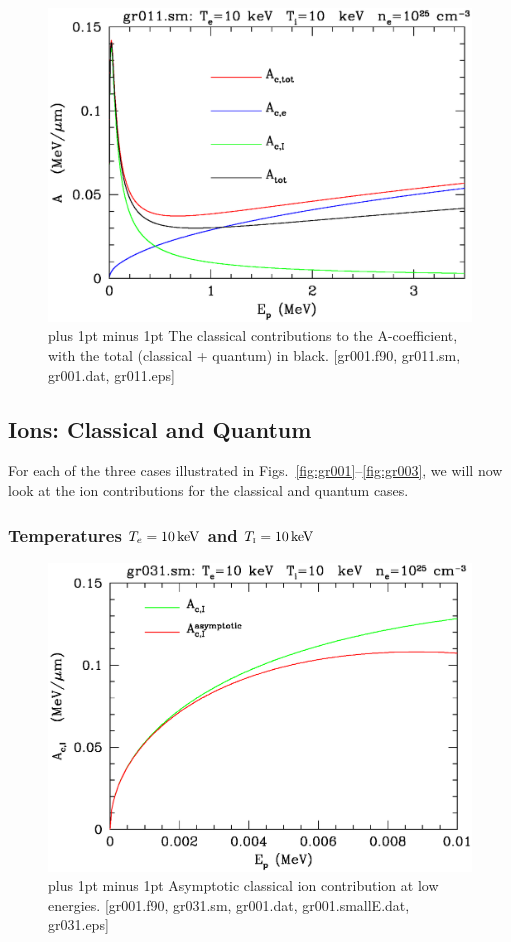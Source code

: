 \documentclass[preprint,12pt,eqsecnum,nofootinbib,amsmath,amssymb]{revtex4}
\newcommand{\smI}{{\rm\scriptscriptstyle I}}
\newcommand{\footnoteskip}{\baselineskip 12pt plus 1pt minus 1pt}
\begin{document}
\begin{figure}[h!]
\includegraphics[scale=0.45]{gr011.eps} 
\vskip-0.8cm 
\caption{\footnoteskip  
  The classical contributions to the {\cal A}-coefficient, with the
  total (classical + quantum) in black.  [gr001.f90, gr011.sm,
  gr001.dat, gr011.eps] 
}
\label{fig:gr011}
\end{figure}


\pagebreak
\subsection{Ions: Classical and Quantum}

For each of the three cases illustrated in
Figs.~\ref{fig:gr001}--\ref{fig:gr003}, we will now look at the ion
contributions for the classical and quantum cases.

\subsubsection{Temperatures $T_e=10\,{\rm keV}$ and $T_\smI=10\,{\rm keV}$}

\vskip-2cm 
\begin{figure}[h!]
\includegraphics[scale=0.45]{gr031.eps} 
\vskip-0.8cm 
\caption{\footnoteskip  
  Asymptotic classical ion contribution at low energies. [gr001.f90,
  gr031.sm, gr001.dat, gr001.smallE.dat, gr031.eps] 
}
\label{fig:gr031}
\end{figure}
\end{document}
